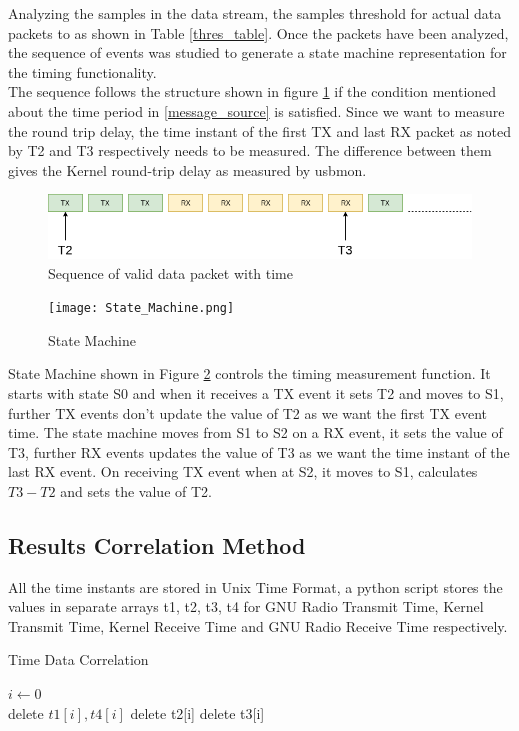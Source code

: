 \documentclass{kththesis}
\begin{document}
Analyzing the samples in the data stream, the samples threshold for actual data packets to as shown in Table \ref{thres_table}.  Once the packets have been analyzed, the sequence of events was studied to generate a state machine representation for the timing functionality.\\ 
The sequence follows the structure shown in figure \ref{sequence} if the condition mentioned about the time period in \ref{message_source} is satisfied. Since we want to measure the round trip delay, the time instant of the first TX and last RX packet as noted by T2 and T3 respectively needs to be measured. The difference between them gives the Kernel round-trip delay as measured by usbmon.    
\begin{figure}[h!]
\centering
\includegraphics[width=\textwidth]{Sequence.png}
\caption{Sequence of valid data packet with time}
\label{sequence}
\end{figure}
\begin{figure}[h!]
\centering
\texttt{[image: State\_Machine.png]}
\caption{State Machine}
\label{state_machine}
\end{figure}

State Machine shown in Figure \ref{state_machine} controls the timing measurement function. It starts with state S0 and when it receives a TX event it sets T2 and moves to S1, further TX events don't update the value of T2 as we want the first TX event time. The state machine moves from S1 to S2 on a RX event, it sets the value of T3, further RX events updates the value of T3 as we want the time instant of the last RX event. On receiving TX event when at S2, it moves to S1, calculates $T3-T2$ and sets the value of T2.
\subsection{Results Correlation Method}
All the time instants are stored in Unix Time Format, a python script stores the values in separate arrays t1, t2, t3, t4 for GNU Radio Transmit Time, Kernel Transmit Time, Kernel Receive Time and GNU Radio Receive Time respectively. 

\begin{algorithm}[!h]
\caption{Time Data Correlation}
\begin{algorithmic}
\State $i \gets 0$
 \\
\hspace{1.35cm} delete $t1[i],t4[i]$
delete t2[i]
delete t3[i] 
\EndIf
\EndFor
\end{algorithmic}
\end{algorithm}
\end{document}
